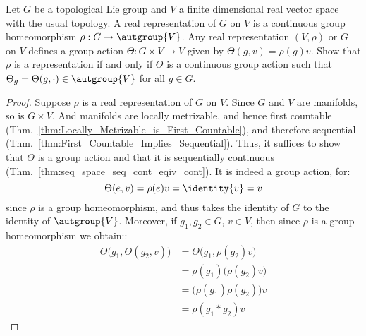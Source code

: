 \documentclass{article}                                                        %
\begin{document}
            \begin{problem}
                Let $G$ be a topological Lie group and $V$ a finite dimensional real
                vector space with the usual topology. A real representation of $G$
                on $V$ is a continuous group homeomorphism
                $\rho:G\rightarrow\autgroup{V}$. Any real representation $(V,\rho)$
                or $G$ on $V$ defines a group action
                $\Theta:G\times{V}\rightarrow{V}$ given by
                $\Theta(g,v)=\rho(g)v$. Show that $\rho$ is a representation if and
                only if $\Theta$ is a continuous group action such that
                $\Theta_{g}=\Theta(g,\cdot)\in\autgroup{V}$ for all $g\in{G}$.
            \end{problem}
            \begin{proof}
                Suppose $\rho$ is a real representation of $G$ on $V$. Since $G$ and
                $V$ are manifolds, so is $G\times{V}$. And manifolds are locally
                metrizable, and hence first countable
                (Thm.~\ref{thm:Locally_Metrizable_is_First_Countable}), and
                therefore sequential
                (Thm.~\ref{thm:First_Countable_Implies_Sequential}). Thus, it
                suffices to show that $\Theta$ is a group action and that it is
                sequentially continuous
                (Thm.~\ref{thm:seq_space_seq_cont_eqiv_cont}). It is indeed a group
                action, for:
                \begin{equation}
                    \Theta(e,v)=\rho(e)v=\identity{v}=v
                \end{equation}
                since $\rho$ is a group homeomorphism, and thus takes the identity
                of $G$ to the identity of $\autgroup{V}$. Moreover, if
                $g_{1},g_{2}\in{G}$, $v\in{V}$, then since $\rho$ is a group
                homeomorphism we obtain::
                \begin{subequations}
                    \begin{align}
                        \Theta\big(g_{1},\Theta(g_{2},v)\big)
                            &=\Theta\big(g_{1},\rho(g_{2})v\big)\\
                            &=\rho(g_{1})\big(\rho(g_{2})v\big)\\
                            &=\big(\rho(g_{1})\rho(g_{2})\big)v\\
                            &=\rho(g_{1}*g_{2})v
                    \end{align}

\end{subequations}
\end{proof}
\end{document}
